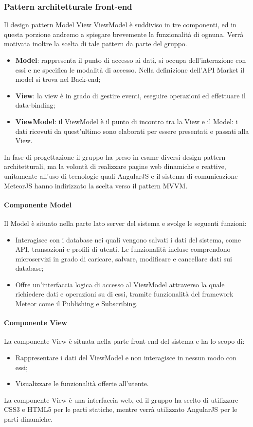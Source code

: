 \subsubsection{Pattern architetturale front-end}
Il design pattern Model View ViewModel è suddiviso in tre componenti, ed in questa porzione andremo a spiegare brevemente la funzionalità di ognuna. Verrà motivata inoltre la scelta di tale pattern da parte del gruppo.

\begin{itemize}
	\item \textbf{Model}: rappresenta il punto di accesso ai dati, si occupa dell'interazione con essi e ne specifica le modalità di accesso. Nella definizione dell'API Market il model si trova nel Back-end;
	\item \textbf{View}: la view è in grado di gestire eventi, eseguire operazioni ed effettuare il data-binding;
	\item \textbf{ViewModel}: il ViewModel è  il punto di incontro tra la View e il Model: i dati ricevuti da quest’ultimo sono elaborati per essere presentati e passati alla View.
\end{itemize}

In fase di progettazione il gruppo ha preso in esame diversi design pattern architetturali, ma la volontà di realizzare pagine web dinamiche e reattive, unitamente all'uso di tecnologie quali AngularJS e il sistema di comunicazione MeteorJS hanno indirizzato la scelta verso il pattern MVVM.

\paragraph{Componente Model}
Il Model è situato nella parte lato server del sistema e svolge le seguenti funzioni:
\begin{itemize}
	\item Interagisce con i database nei quali vengono salvati i dati del sistema, come API, transazioni e profili di utenti. Le funzionalità incluse comprendono microservizi in grado di caricare, salvare, modificare e cancellare dati sui database;
	\item Offre un'interfaccia logica di accesso al ViewModel attraverso la quale richiedere dati e operazioni su di essi, tramite funzionalità del framework Meteor come il Publishing e Subscribing.
\end{itemize}
\paragraph{Componente View}
La componente View è situata nella parte front-end del sistema e ha lo scopo di:
\begin{itemize}
	\item  Rappresentare i dati del ViewModel e non interagisce in nessun modo con essi;
	\item Visualizzare le funzionalità offerte all'utente.
\end{itemize} 
La componente View è una interfaccia web, ed il gruppo ha scelto di utilizzare CSS3 e HTML5 per le parti statiche, mentre verrà utilizzato AngularJS per le parti dinamiche. 
